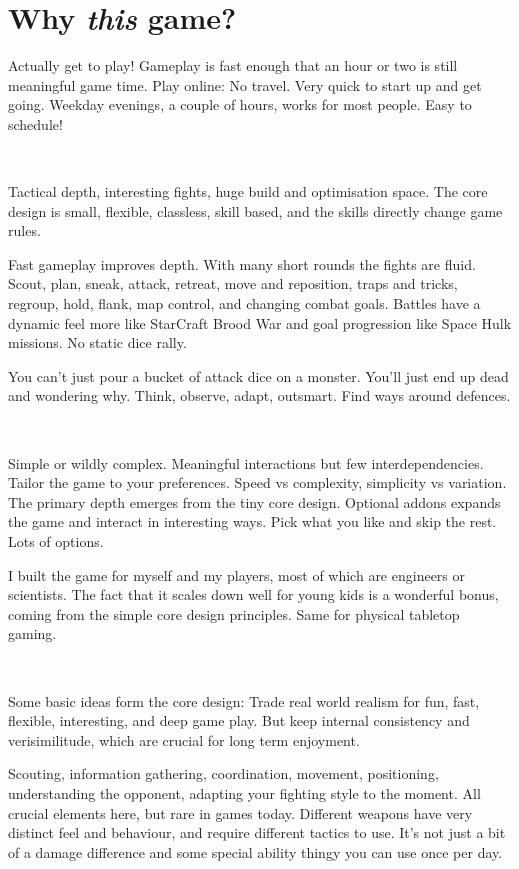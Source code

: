 \clearpage %

\noindent
\section*{Why \emph{this} game?}

\noindent
Actually get to play! Gameplay is fast enough that an hour or two is still meaningful game time. Play online: No travel. Very quick to start up and get going. Weekday evenings, a couple of hours, works for most people. Easy to schedule!

\

\noindent
Tactical depth, interesting fights, huge build and optimisation space. The core design is small, flexible, classless, skill based, and the skills directly change game rules.

Fast gameplay improves depth. With many short rounds the fights are fluid. Scout, plan, sneak, attack, retreat, move and reposition, traps and tricks, regroup, hold, flank, map control, and changing combat goals.
Battles have a dynamic feel more like StarCraft Brood War and goal progression like Space Hulk missions. No static dice rally.

You can't just pour a bucket of attack dice on a monster. You'll just end up dead and wondering why. Think, observe, adapt, outsmart. Find ways around defences.

\

\noindent
Simple or wildly complex. Meaningful interactions but few interdependencies. Tailor the game to your preferences. Speed vs complexity, simplicity vs variation. The primary depth emerges from the tiny core design. Optional addons expands the game and interact in interesting ways. Pick what you like and skip the rest. Lots of options.

I built the game for myself and my players, most of which are engineers or scientists. The fact that it scales down well for young kids is a wonderful bonus, coming from the simple core design principles. Same for physical tabletop gaming.

\

\noindent
Some basic ideas form the core design: Trade real world realism for fun, fast, flexible, interesting, and deep game play. But keep internal consistency and verisimilitude, which are crucial for long term enjoyment.

Scouting, information gathering, coordination, movement, positioning, understanding the opponent, adapting your fighting style to the moment. All crucial elements here, but rare in games today. Different weapons have very distinct feel and behaviour, and require different tactics to use. It's not just a bit of a damage difference and some special ability thingy you can use once per day.





